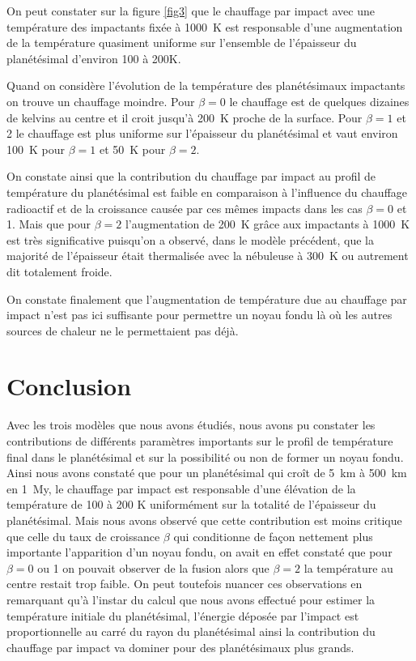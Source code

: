 \documentclass[10pt,a4paper]{article}
\numberwithin{equation}{section}
\begin{document}
On peut constater sur la figure \ref{fig3} que le chauffage par impact avec une température des impactants fixée à \SI{1000}{K} est responsable d'une augmentation de la température quasiment uniforme sur l'ensemble de l'épaisseur du planétésimal d'environ 100 à 200K. 

Quand on considère l'évolution de la température des planétésimaux impactants on trouve un chauffage moindre. Pour $\beta = 0$ le chauffage est de quelques dizaines de kelvins au centre et il croit jusqu'à \SI{200}{K} proche de la surface. Pour $\beta = 1$ et 2 le chauffage est plus uniforme sur l'épaisseur du planétésimal et vaut environ \SI{100}{K} pour $\beta = 1$ et \SI{50}{K} pour $\beta = 2$.

On constate ainsi que la contribution du chauffage par impact au profil de température du planétésimal est faible en comparaison à l'influence du chauffage radioactif et de la croissance causée par ces mêmes impacts dans les cas $\beta=0$ et 1. Mais que pour $\beta = 2$ l’augmentation de \SI{200}{K} grâce aux impactants à \SI{1000}{K} est très significative puisqu'on a observé, dans le modèle précédent, que la majorité de l'épaisseur était thermalisée avec la nébuleuse à \SI{300}{K} ou autrement dit totalement froide.

On constate finalement que l'augmentation de température due au chauffage par impact n'est pas ici suffisante pour permettre un noyau fondu là où les autres sources de chaleur ne le permettaient pas déjà.


\section*{Conclusion}

Avec les trois modèles que nous avons étudiés, nous avons pu constater les contributions de différents paramètres importants sur le profil de température final dans le planétésimal et sur la possibilité ou non de former un noyau fondu. Ainsi nous avons constaté que pour un planétésimal qui croît de \SI{5}{km} à \SI{500}{km} en \SI{1}{My}, le chauffage par impact est responsable d'une élévation de la température de 100 à 200 K uniformément sur la totalité de l'épaisseur du planétésimal. Mais nous avons observé que cette contribution est moins critique que celle du taux de croissance $\beta$ qui conditionne de façon nettement plus importante l'apparition d'un noyau fondu, on avait en effet constaté que pour $\beta = 0$ ou 1 on pouvait observer de la fusion alors que $\beta=2$ la température au centre restait trop faible.
On peut toutefois nuancer ces observations en remarquant qu'à l'instar du calcul que nous avons effectué pour estimer la température initiale du planétésimal, l'énergie déposée par l'impact est proportionnelle au carré du rayon du planétésimal ainsi la contribution du chauffage par impact va dominer pour des planétésimaux plus grands.
\end{document}
